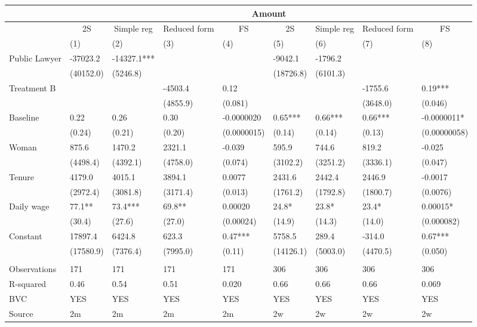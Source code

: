 \begin{tabular}{lllllllll}
\toprule
      & \multicolumn{8}{c}{Amount} \\
\midrule
\midrule
      & \multicolumn{1}{c}{2S} & \multicolumn{1}{c}{Simple reg} & \multicolumn{1}{c}{Reduced form} & \multicolumn{1}{c}{FS} & \multicolumn{1}{c}{2S} & \multicolumn{1}{c}{Simple reg} & \multicolumn{1}{c}{Reduced form} & \multicolumn{1}{c}{FS} \\
\midrule
      & (1)   & (2)   & (3)   & (4)   & (5)   & (6)   & (7)   & (8) \\
\midrule
\midrule
Public Lawyer & -37023.2 & -14327.1*** &       &       & -9042.1 & -1796.2 &       &  \\
      & (40152.0) & (5246.8) &       &       & (18726.8) & (6101.3) &       &  \\
Treatment B &       &       & -4503.4 & 0.12  &       &       & -1755.6 & 0.19*** \\
      &       &       & (4855.9) & (0.081) &       &       & (3648.0) & (0.046) \\
Baseline & 0.22  & 0.26  & 0.30  & -0.0000020 & 0.65*** & 0.66*** & 0.66*** & -0.0000011* \\
      & (0.24) & (0.21) & (0.20) & (0.0000015) & (0.14) & (0.14) & (0.13) & (0.00000058) \\
Woman & 875.6 & 1470.2 & 2321.1 & -0.039 & 595.9 & 744.6 & 819.2 & -0.025 \\
      & (4498.4) & (4392.1) & (4758.0) & (0.074) & (3102.2) & (3251.2) & (3336.1) & (0.047) \\
Tenure & 4179.0 & 4015.1 & 3894.1 & 0.0077 & 2431.6 & 2442.4 & 2446.9 & -0.0017 \\
      & (2972.4) & (3081.8) & (3171.4) & (0.013) & (1761.2) & (1792.8) & (1800.7) & (0.0076) \\
Daily wage & 77.1** & 73.4*** & 69.8** & 0.00020 & 24.8* & 23.8* & 23.4* & 0.00015* \\
      & (30.4) & (27.6) & (27.0) & (0.00024) & (14.9) & (14.3) & (14.0) & (0.000082) \\
Constant & 17897.4 & 6424.8 & 623.3 & 0.47*** & 5758.5 & 289.4 & -314.0 & 0.67*** \\
      & (17580.9) & (7376.4) & (7995.0) & (0.11) & (14126.1) & (5003.0) & (4470.5) & (0.050) \\
      &       &       &       &       &       &       &       &  \\
\midrule
Observations & 171   & 171   & 171   & 171   & 306   & 306   & 306   & 306 \\
R-squared & 0.46  & 0.54  & 0.51  & 0.020 & 0.66  & 0.66  & 0.66  & 0.069 \\
BVC   & YES   & YES   & YES   & YES   & YES   & YES   & YES   & YES \\
Source & 2m    & 2m    & 2m    & 2m    & 2w    & 2w    & 2w    & 2w \\
\bottomrule
\bottomrule
\end{tabular}%

